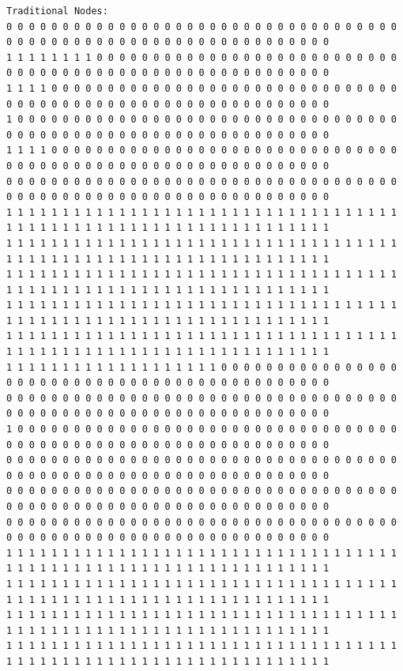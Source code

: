 \documentclass [10 pt, a4 paper]{report}
\begin{document}
\begin{lstlisting}[caption=Output of the simulation once it is finished, label={lst:code1}, frame=single]
Traditional Nodes:
0 0 0 0 0 0 0 0 0 0 0 0 0 0 0 0 0 0 0 0 0 0 0 0 0 0 0 0 0 0 0 0 0 0 0 0 0 0 0 0 0 0 0 0 0 0 0 0 0 0 0 0 0 0 0 0 0 0 0 0 0 0 0 0
1 1 1 1 1 1 1 1 0 0 0 0 0 0 0 0 0 0 0 0 0 0 0 0 0 0 0 0 0 0 0 0 0 0 0 0 0 0 0 0 0 0 0 0 0 0 0 0 0 0 0 0 0 0 0 0 0 0 0 0 0 0 0 0
1 1 1 1 0 0 0 0 0 0 0 0 0 0 0 0 0 0 0 0 0 0 0 0 0 0 0 0 0 0 0 0 0 0 0 0 0 0 0 0 0 0 0 0 0 0 0 0 0 0 0 0 0 0 0 0 0 0 0 0 0 0 0 0
1 0 0 0 0 0 0 0 0 0 0 0 0 0 0 0 0 0 0 0 0 0 0 0 0 0 0 0 0 0 0 0 0 0 0 0 0 0 0 0 0 0 0 0 0 0 0 0 0 0 0 0 0 0 0 0 0 0 0 0 0 0 0 0
1 1 1 1 0 0 0 0 0 0 0 0 0 0 0 0 0 0 0 0 0 0 0 0 0 0 0 0 0 0 0 0 0 0 0 0 0 0 0 0 0 0 0 0 0 0 0 0 0 0 0 0 0 0 0 0 0 0 0 0 0 0 0 0
0 0 0 0 0 0 0 0 0 0 0 0 0 0 0 0 0 0 0 0 0 0 0 0 0 0 0 0 0 0 0 0 0 0 0 0 0 0 0 0 0 0 0 0 0 0 0 0 0 0 0 0 0 0 0 0 0 0 0 0 0 0 0 0
1 1 1 1 1 1 1 1 1 1 1 1 1 1 1 1 1 1 1 1 1 1 1 1 1 1 1 1 1 1 1 1 1 1 1 1 1 1 1 1 1 1 1 1 1 1 1 1 1 1 1 1 1 1 1 1 1 1 1 1 1 1 1 1
1 1 1 1 1 1 1 1 1 1 1 1 1 1 1 1 1 1 1 1 1 1 1 1 1 1 1 1 1 1 1 1 1 1 1 1 1 1 1 1 1 1 1 1 1 1 1 1 1 1 1 1 1 1 1 1 1 1 1 1 1 1 1 1
1 1 1 1 1 1 1 1 1 1 1 1 1 1 1 1 1 1 1 1 1 1 1 1 1 1 1 1 1 1 1 1 1 1 1 1 1 1 1 1 1 1 1 1 1 1 1 1 1 1 1 1 1 1 1 1 1 1 1 1 1 1 1 1
1 1 1 1 1 1 1 1 1 1 1 1 1 1 1 1 1 1 1 1 1 1 1 1 1 1 1 1 1 1 1 1 1 1 1 1 1 1 1 1 1 1 1 1 1 1 1 1 1 1 1 1 1 1 1 1 1 1 1 1 1 1 1 1
1 1 1 1 1 1 1 1 1 1 1 1 1 1 1 1 1 1 1 1 1 1 1 1 1 1 1 1 1 1 1 1 1 1 1 1 1 1 1 1 1 1 1 1 1 1 1 1 1 1 1 1 1 1 1 1 1 1 1 1 1 1 1 1
1 1 1 1 1 1 1 1 1 1 1 1 1 1 1 1 1 1 1 0 0 0 0 0 0 0 0 0 0 0 0 0 0 0 0 0 0 0 0 0 0 0 0 0 0 0 0 0 0 0 0 0 0 0 0 0 0 0 0 0 0 0 0 0
0 0 0 0 0 0 0 0 0 0 0 0 0 0 0 0 0 0 0 0 0 0 0 0 0 0 0 0 0 0 0 0 0 0 0 0 0 0 0 0 0 0 0 0 0 0 0 0 0 0 0 0 0 0 0 0 0 0 0 0 0 0 0 0
1 0 0 0 0 0 0 0 0 0 0 0 0 0 0 0 0 0 0 0 0 0 0 0 0 0 0 0 0 0 0 0 0 0 0 0 0 0 0 0 0 0 0 0 0 0 0 0 0 0 0 0 0 0 0 0 0 0 0 0 0 0 0 0
0 0 0 0 0 0 0 0 0 0 0 0 0 0 0 0 0 0 0 0 0 0 0 0 0 0 0 0 0 0 0 0 0 0 0 0 0 0 0 0 0 0 0 0 0 0 0 0 0 0 0 0 0 0 0 0 0 0 0 0 0 0 0 0
0 0 0 0 0 0 0 0 0 0 0 0 0 0 0 0 0 0 0 0 0 0 0 0 0 0 0 0 0 0 0 0 0 0 0 0 0 0 0 0 0 0 0 0 0 0 0 0 0 0 0 0 0 0 0 0 0 0 0 0 0 0 0 0
0 0 0 0 0 0 0 0 0 0 0 0 0 0 0 0 0 0 0 0 0 0 0 0 0 0 0 0 0 0 0 0 0 0 0 0 0 0 0 0 0 0 0 0 0 0 0 0 0 0 0 0 0 0 0 0 0 0 0 0 0 0 0 0
1 1 1 1 1 1 1 1 1 1 1 1 1 1 1 1 1 1 1 1 1 1 1 1 1 1 1 1 1 1 1 1 1 1 1 1 1 1 1 1 1 1 1 1 1 1 1 1 1 1 1 1 1 1 1 1 1 1 1 1 1 1 1 1
1 1 1 1 1 1 1 1 1 1 1 1 1 1 1 1 1 1 1 1 1 1 1 1 1 1 1 1 1 1 1 1 1 1 1 1 1 1 1 1 1 1 1 1 1 1 1 1 1 1 1 1 1 1 1 1 1 1 1 1 1 1 1 1
1 1 1 1 1 1 1 1 1 1 1 1 1 1 1 1 1 1 1 1 1 1 1 1 1 1 1 1 1 1 1 1 1 1 1 1 1 1 1 1 1 1 1 1 1 1 1 1 1 1 1 1 1 1 1 1 1 1 1 1 1 1 1 1
1 1 1 1 1 1 1 1 1 1 1 1 1 1 1 1 1 1 1 1 1 1 1 1 1 1 1 1 1 1 1 1 1 1 1 1 1 1 1 1 1 1 1 1 1 1 1 1 1 1 1 1 1 1 1 1 1 1 1 1 1 1 1 1

\end{lstlisting}
\end{document}
